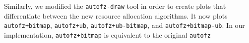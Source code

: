 Similarly, we modified the \texttt{autofz-draw} tool in order to create plots that 
differentiate between the new resource allocation algorithms. It now plots \texttt{autofz+bitmap}, 
\texttt{autofz+ub}, \texttt{autofz+ub-bitmap}, and \texttt{autofz+bitmap-ub}. In our 
implementation, \texttt{autofz+bitmap} is equivalent to the original \texttt{autofz}